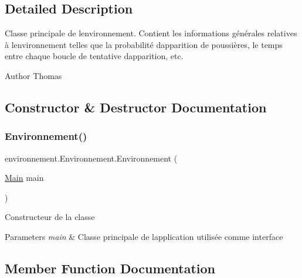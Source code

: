 \subsection{Detailed Description}
Classe principale de l\textquotesingle{}environnement. Contient les informations générales relatives à l\textquotesingle{}environnement telles que la probabilité d\textquotesingle{}apparition de poussières, le temps entre chaque boucle de tentative d\textquotesingle{}apparition, etc. \begin{DoxyAuthor}{Author}
Thomas 
\end{DoxyAuthor}


\subsection{Constructor \& Destructor Documentation}
\hypertarget{classenvironnement_1_1_environnement_a664559901643eb5f45ddbf1ec082696b}{}\label{classenvironnement_1_1_environnement_a664559901643eb5f45ddbf1ec082696b} 
\subsubsection{\texorpdfstring{Environnement()}{Environnement()}}
{\footnotesize\ttfamily environnement.\+Environnement.\+Environnement (\begin{DoxyParamCaption}\item[{\hyperlink{classmain_1_1_main}{Main}}]{main }\end{DoxyParamCaption})}

Constructeur de la classe 
\begin{DoxyParams}{Parameters}
{\em main} & Classe principale de l\textquotesingle{}application utilisée comme interface \\
\hline
\end{DoxyParams}


\subsection{Member Function Documentation}
\hypertarget{classenvironnement_1_1_environnement_addd77a3e76cf5eb6c3b0270916e4812a}{}\label{classenvironnement_1_1_environnement_addd77a3e76cf5eb6c3b0270916e4812a} 
